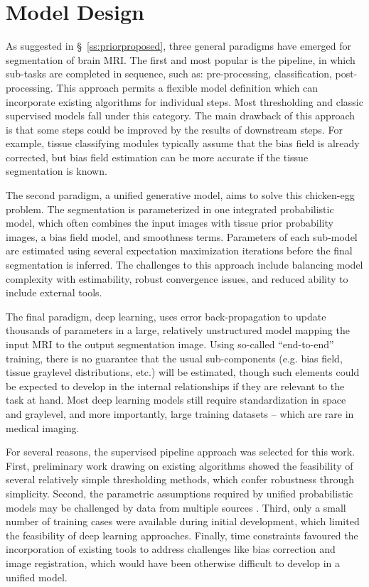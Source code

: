\section{Model Design}\label{s:modelconcept}
As suggested in \S\ \ref{ss:priorproposed}, three general paradigms have emerged for segmentation of brain MRI. The first and most popular is the pipeline, in which sub-tasks are completed in sequence, such as: pre-processing, classification, post-processing. This approach permits a flexible model definition which can incorporate existing algorithms for individual steps. Most thresholding and classic supervised models fall under this category. The main drawback of this approach is that some steps could be improved by the results of downstream steps. For example, tissue classifying modules typically assume that the bias field is already corrected, but bias field estimation can be more accurate if the tissue segmentation is known.
\par
The second paradigm, a unified generative model, aims to solve this chicken-egg problem. The segmentation is parameterized in one integrated probabilistic model, which often combines the input images with tissue prior probability images, a bias field model, and smoothness terms. Parameters of each sub-model are estimated using several expectation maximization iterations before the final segmentation is inferred. The challenges to this approach include balancing model complexity with estimability, robust convergence issues, and reduced ability to include external tools.
\par
The final paradigm, deep learning, uses error back-propagation to update thousands of parameters in a large, relatively unstructured model mapping the input MRI to the output segmentation image. Using so-called ``end-to-end'' training, there is no guarantee that the usual sub-components (e.g. bias field, tissue graylevel distributions, etc.) will be estimated, though such elements could be expected to develop in the internal relationships if they are relevant to the task at hand. Most deep learning models still require standardization in space and graylevel, and more importantly, large training datasets -- which are rare in medical imaging.
\par
For several reasons, the supervised pipeline approach was selected for this work.
First, preliminary work drawing on existing algorithms \cite{Khademi2014,Schmidt2015} showed the feasibility of several relatively simple thresholding methods, which confer robustness through simplicity.
Second, the parametric assumptions required by unified probabilistic models may be challenged by data from multiple sources \cite{VanLeemput2001}.
Third, only a small number of training cases were available during initial development, which limited the feasibility of deep learning approaches.
Finally, time constraints favoured the incorporation of existing tools to address challenges like bias correction and image registration, which would have been otherwise difficult to develop in a unified model.
